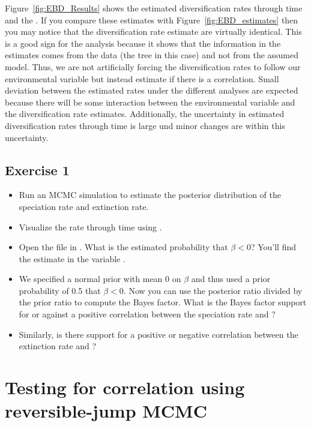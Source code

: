 Figure~\ref{fig:EBD_Results} shows the estimated diversification rates through time and the \COO.
If you compare these estimates with Figure~\ref{fig:EBD_estimates} then you may notice that the diversification rate estimate are virtually identical.
This is a good sign for the analysis because it shows that the information in the estimates comes from the data (the tree in this case) and not from the assumed model.
Thus, we are not artificially forcing the diversification rates to follow our environmental variable but instead estimate if there is a correlation.
Small deviation between the estimated rates under the different analyses are expected because there will be some interaction between the environmental variable and the diversification rate estimates.
Additionally, the uncertainty in estimated diversification rates through time is large und minor changes are within this uncertainty. 


\subsection{Exercise 1}

\begin{itemize}
\item Run an MCMC simulation to estimate the posterior distribution of the speciation rate and extinction rate.
\item Visualize the rate through time using \R.
\item Open the file  in \Tracer. What is the estimated probability that $\beta<0$? You'll find the estimate in the variable .
\item We specified a normal prior with mean 0 on $\beta$ and thus used a prior probability of 0.5 that $\beta<0$. Now you can use the posterior ratio divided by the prior ratio to compute the Bayes factor. What is the Bayes factor support for or against a positive correlation between the speciation rate and \COO?
\item Similarly, is there support for a positive or negative correlation between the extinction rate and \COO?
\end{itemize}




\bigskip
\section{Testing for correlation using reversible-jump MCMC}

